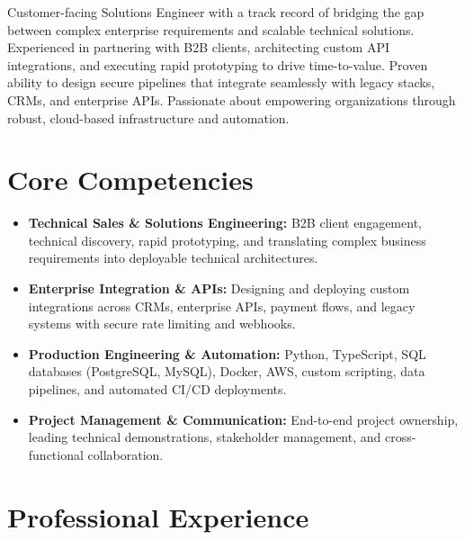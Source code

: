 \documentclass[11pt,a4paper,sans]{moderncv}
\begin{document}
\makecvtitle

Customer-facing Solutions Engineer with a track record of bridging the gap between complex enterprise requirements and scalable technical solutions. Experienced in partnering with B2B clients, architecting custom API integrations, and executing rapid prototyping to drive time-to-value. Proven ability to design secure pipelines that integrate seamlessly with legacy stacks, CRMs, and enterprise APIs. Passionate about empowering organizations through robust, cloud-based infrastructure and automation.

\section{Core Competencies}
\begin{itemize}
\item \textbf{Technical Sales \& Solutions Engineering:} B2B client engagement, technical discovery, rapid prototyping, and translating complex business requirements into deployable technical architectures.
\item \textbf{Enterprise Integration \& APIs:} Designing and deploying custom integrations across CRMs, enterprise APIs, payment flows, and legacy systems with secure rate limiting and webhooks.
\item \textbf{Production Engineering \& Automation:} Python, TypeScript, SQL databases (PostgreSQL, MySQL), Docker, AWS, custom scripting, data pipelines, and automated CI/CD deployments.
\item \textbf{Project Management \& Communication:} End-to-end project ownership, leading technical demonstrations, stakeholder management, and cross-functional collaboration.
\end{itemize}

\section{Professional Experience}
\end{document}
